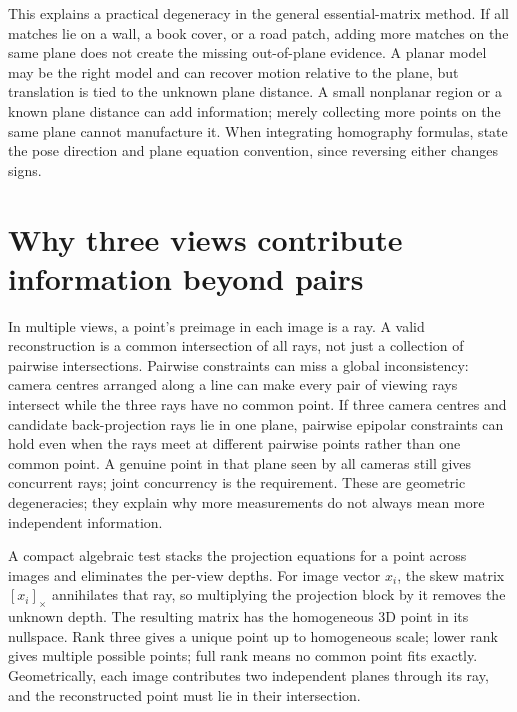 This explains a practical degeneracy in the general essential-matrix method. If all matches lie on a wall, a book cover, or a road patch, adding more matches on the same plane does not create the missing out-of-plane evidence. A planar model may be the right model and can recover motion relative to the plane, but translation is tied to the unknown plane distance. A small nonplanar region or a known plane distance can add information; merely collecting more points on the same plane cannot manufacture it. When integrating homography formulas, state the pose direction and plane equation convention, since reversing either changes signs.

\section{Why three views contribute information beyond pairs}\label{02-foundations-ii-ch036-why-three-views-contribute-information-beyond-pairs}

\hypertarget{02-foundations-ii-ch036-why-three-views-contribute-information-beyond-pairs}{}

In multiple views, a point's preimage in each image is a ray. A valid reconstruction is a common intersection of all rays, not just a collection of pairwise intersections. Pairwise constraints can miss a global inconsistency: camera centres arranged along a line can make every pair of viewing rays intersect while the three rays have no common point. If three camera centres and candidate back-projection rays lie in one plane, pairwise epipolar constraints can hold even when the rays meet at different pairwise points rather than one common point. A genuine point in that plane seen by all cameras still gives concurrent rays; joint concurrency is the requirement. These are geometric degeneracies; they explain why more measurements do not always mean more independent information.

A compact algebraic test stacks the projection equations for a point across images and eliminates the per-view depths. For image vector \(x_i\), the skew matrix \([x_i]_\times\) annihilates that ray, so multiplying the projection block by it removes the unknown depth. The resulting matrix has the homogeneous 3D point in its nullspace. Rank three gives a unique point up to homogeneous scale; lower rank gives multiple possible points; full rank means no common point fits exactly. Geometrically, each image contributes two independent planes through its ray, and the reconstructed point must lie in their intersection.

